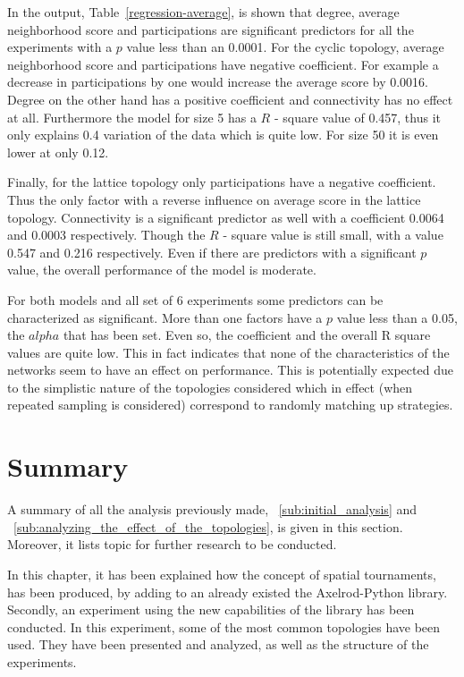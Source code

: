 In the output, Table~\ref{regression-average}, is shown that degree, average
neighborhood score and participations
are significant predictors for all the experiments with a \(p\) value less than
an 0.0001.
For the cyclic topology, average neighborhood score and participations have negative
coefficient. For example a decrease in participations by one would increase
the average score by 0.0016. Degree on the other hand has a positive coefficient
and connectivity has no effect at all. Furthermore the model for size 5 has
a \(R\) - square value of 0.457, thus it only explains 0.4 variation of the data which is
quite low. For size 50 it is even lower at only 0.12.

Finally, for the lattice topology only participations have a negative coefficient.
Thus the only factor with a reverse influence on average score in the lattice topology.
Connectivity is a significant predictor as well with a coefficient 0.0064 and
0.0003 respectively. Though the \(R\) - square value is still  small,
with a value 0.547 and 0.216 respectively.
Even if there are predictors with a significant \(p\) value, the overall
performance of the model is moderate.

For both models and all set of 6 experiments some predictors can be characterized
as significant. More than one factors have a \(p\) value less than a 0.05, the \(alpha\)
that has been set. Even so, the coefficient and the overall R square values are
quite low. This in fact indicates
that none of the characteristics of the networks seem to have an effect on
performance. This is potentially expected due to the simplistic nature of the
topologies considered which in effect (when repeated sampling is considered)
correspond to randomly matching up strategies.


\section{Summary}
\label{sub:summary}
A summary of all the analysis previously made, ~\ref{sub:initial_analysis} and
~\ref{sub:analyzing_the_effect_of_the_topologies}, is given in this section.
Moreover, it lists topic for further research to be conducted.

In this chapter, it has been explained how the concept of spatial tournaments,
has been produced, by adding to an already existed the Axelrod-Python library.
Secondly, an experiment using the new capabilities of the library has been
conducted. In this experiment, some of the most common topologies have been used.
They have been presented and analyzed, as well as the structure of the experiments.


